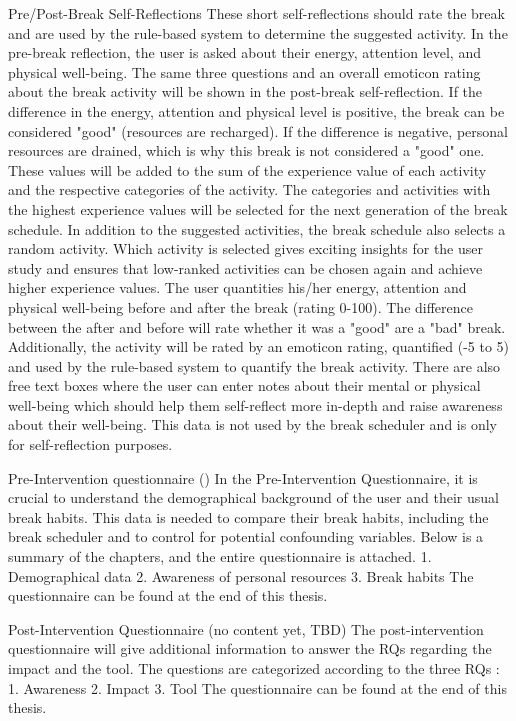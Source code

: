 \documentclass{hasel_thesis}
\begin{document}
Pre/Post-Break Self-Reflections
These short self-reflections should rate the break and are used by the rule-based system to determine the suggested activity. In the pre-break reflection, the user is asked about their energy, attention level, and physical well-being. The same three questions and an overall emoticon rating about the break activity will be shown in the post-break self-reflection. If the difference in the energy, attention and physical level is positive, the break can be considered "good" (resources are recharged). If the difference is negative, personal resources are drained, which is why this break is not considered a "good" one. These values will be added to the sum of the experience value of each activity and the respective categories of the activity. The categories and activities with the highest experience values will be selected for the next generation of the break schedule. In addition to the suggested activities, the break schedule also selects a random activity. Which activity is selected gives exciting insights for the user study and ensures that low-ranked activities can be chosen again and achieve higher experience values. The user quantities his/her energy, attention and physical well-being before and after the break (rating 0-100). The difference between the after and before will rate whether it was a "good" are a "bad" break.
Additionally, the activity will be rated by an emoticon rating, quantified (-5 to 5) and used by the rule-based system to quantify the break activity. There are also free text boxes where the user can enter notes about their mental or physical well-being which should help them self-reflect more in-depth and raise awareness about their well-being. This data is not used by the break scheduler and is only for self-reflection purposes.

Pre-Intervention questionnaire ()
In the Pre-Intervention Questionnaire, it is crucial to understand the demographical background of the user and their usual break habits. This data is needed to compare their break habits, including the break scheduler and to control for potential confounding variables. Below is a summary of the chapters, and the entire questionnaire is attached.
1.	Demographical data
2.	Awareness of personal resources
3.	Break habits
The questionnaire can be found at the end of this thesis.

Post-Intervention Questionnaire (no content yet, TBD)
The post-intervention questionnaire will give additional information to answer the RQs regarding the impact and the tool. The questions are categorized according to the three RQs : 
1.	Awareness
2.	Impact
3.	Tool
The questionnaire can be found at the end of this thesis.
\end{document}
